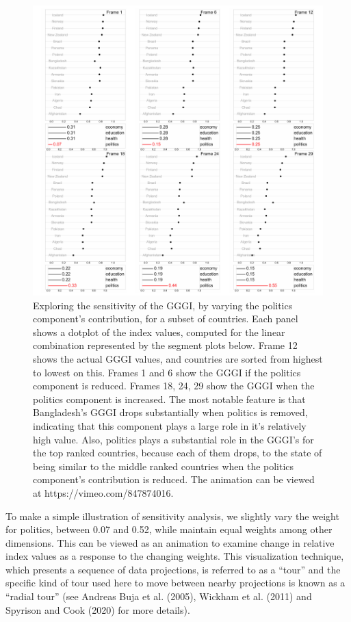 \documentclass[
]{interact}
\begin{document}
\begin{figure}

{\centering \includegraphics{tidyindex_files/figure-pdf/fig-idx-tour-1.pdf}

}

\caption{\label{fig-idx-tour}Exploring the sensitivity of the GGGI, by
varying the politics component's contribution, for a subset of
countries. Each panel shows a dotplot of the index values, computed for
the linear combination represented by the segment plots below. Frame 12
shows the actual GGGI values, and countries are sorted from highest to
lowest on this. Frames 1 and 6 show the GGGI if the politics component
is reduced. Frames 18, 24, 29 show the GGGI when the politics component
is increased. The most notable feature is that Bangladesh's GGGI drops
substantially when politics is removed, indicating that this component
plays a large role in it's relatively high value. Also, politics plays a
substantial role in the GGGI's for the top ranked countries, because
each of them drops, to the state of being similar to the middle ranked
countries when the politics component's contribution is reduced. The
animation can be viewed at https://vimeo.com/847874016.}

\end{figure}

To make a simple illustration of sensitivity analysis, we slightly vary
the weight for politics, between 0.07 and 0.52, while maintain equal
weights among other dimensions. This can be viewed as an animation to
examine change in relative index values as a response to the changing
weights. This visualization technique, which presents a sequence of data
projections, is referred to as a ``tour'' and the specific kind of tour
used here to move between nearby projections is known as a ``radial
tour'' (see Andreas Buja et al. (2005), Wickham et al. (2011) and
Spyrison and Cook (2020) for more details).
\end{document}
